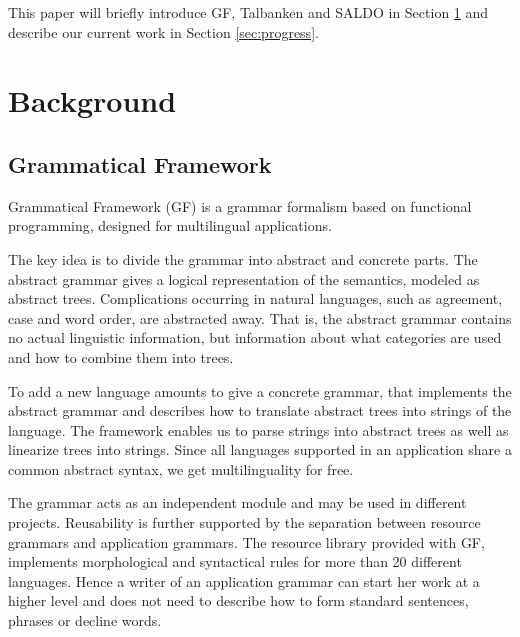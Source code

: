 \documentclass[submission]{eptcs} %
\begin{document}
This paper will briefly introduce GF, Talbanken and SALDO in Section \ref{sec:background}
and describe our current work in Section \ref{sec:progress}.

\section{Background}
\label{sec:background}
\subsection{Grammatical Framework}
\label{sec:gf}


Grammatical Framework\cite{ranta-2011} (GF) is a grammar formalism based on functional
programming, designed for multilingual applications.

The key idea is to divide the grammar into abstract and concrete parts. %
The abstract grammar gives a logical representation of the semantics,
modeled as abstract trees. Complications occurring in
natural languages, such as agreement, case and word order, are abstracted away. 
That is, the abstract grammar contains no actual linguistic information, but
information about what categories are used and how to combine them into trees.

To add a new language amounts to give a concrete grammar, that implements
the abstract grammar and describes how to translate abstract
trees into strings of the language. The framework enables us to parse strings into 
abstract trees as well as linearize trees into strings.
Since all languages supported in an application share a common abstract syntax,
we get multilinguality for free.

The grammar acts as an independent module and may be used in different
projects.
Reusability is further supported by the separation between resource grammars
and application grammars. The resource library provided with GF, 
implements morphological and
syntactical rules for more than 20 different languages.
Hence a writer of an application grammar can start her work at a higher
level and does not need to describe how to 
form standard sentences, phrases or decline words.
\end{document}
